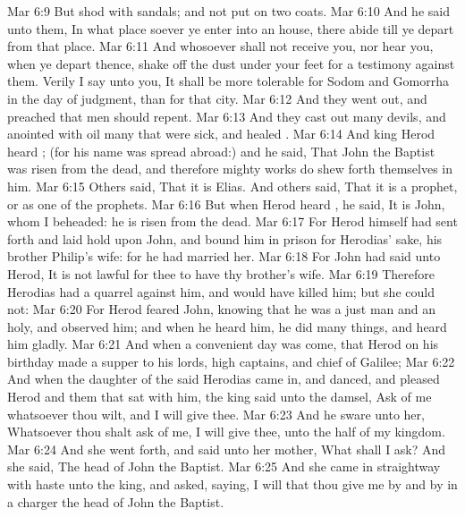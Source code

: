 \vs Mar 6:9 But  shod with sandals; and not put on two coats.
\vs Mar 6:10 And he said unto them, In what place soever ye enter into an house, there abide till ye depart from that place.
\vs Mar 6:11 And whosoever shall not receive you, nor hear you, when ye depart thence, shake off the dust under your feet for a testimony against them. Verily I say unto you, It shall be more tolerable for Sodom and Gomorrha in the day of judgment, than for that city.
\vs Mar 6:12 And they went out, and preached that men should repent.
\vs Mar 6:13 And they cast out many devils, and anointed with oil many that were sick, and healed .
\vs Mar 6:14 And king Herod heard ; (for his name was spread abroad:) and he said, That John the Baptist was risen from the dead, and therefore mighty works do shew forth themselves in him.
\vs Mar 6:15 Others said, That it is Elias. And others said, That it is a prophet, or as one of the prophets.
\vs Mar 6:16 But when Herod heard , he said, It is John, whom I beheaded: he is risen from the dead.
\vs Mar 6:17 For Herod himself had sent forth and laid hold upon John, and bound him in prison for Herodias' sake, his brother Philip's wife: for he had married her.
\vs Mar 6:18 For John had said unto Herod, It is not lawful for thee to have thy brother's wife.
\vs Mar 6:19 Therefore Herodias had a quarrel against him, and would have killed him; but she could not:
\vs Mar 6:20 For Herod feared John, knowing that he was a just man and an holy, and observed him; and when he heard him, he did many things, and heard him gladly.
\vs Mar 6:21 And when a convenient day was come, that Herod on his birthday made a supper to his lords, high captains, and chief  of Galilee;
\vs Mar 6:22 And when the daughter of the said Herodias came in, and danced, and pleased Herod and them that sat with him, the king said unto the damsel, Ask of me whatsoever thou wilt, and I will give  thee.
\vs Mar 6:23 And he sware unto her, Whatsoever thou shalt ask of me, I will give  thee, unto the half of my kingdom.
\vs Mar 6:24 And she went forth, and said unto her mother, What shall I ask? And she said, The head of John the Baptist.
\vs Mar 6:25 And she came in straightway with haste unto the king, and asked, saying, I will that thou give me by and by in a charger the head of John the Baptist.
